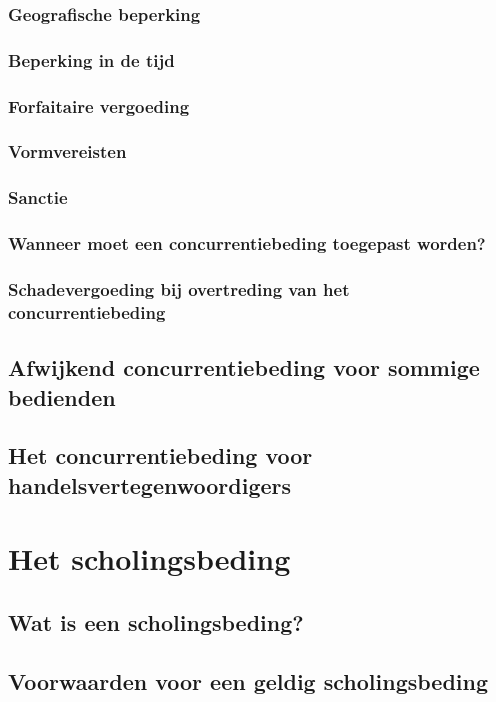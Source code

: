 \subsubsection{Geografische beperking}

\subsubsection{Beperking in de tijd}

\subsubsection{Forfaitaire vergoeding}

\subsubsection{Vormvereisten}

\subsubsection{Sanctie}

\subsubsection{Wanneer moet een concurrentiebeding toegepast worden?}

\subsubsection{Schadevergoeding bij overtreding van het concurrentiebeding}

\subsection{Afwijkend concurrentiebeding voor sommige bedienden}

\subsection{Het concurrentiebeding voor handelsvertegenwoordigers}

\section{Het scholingsbeding}

\subsection{Wat is een scholingsbeding?}

\subsection{Voorwaarden voor een geldig scholingsbeding}

